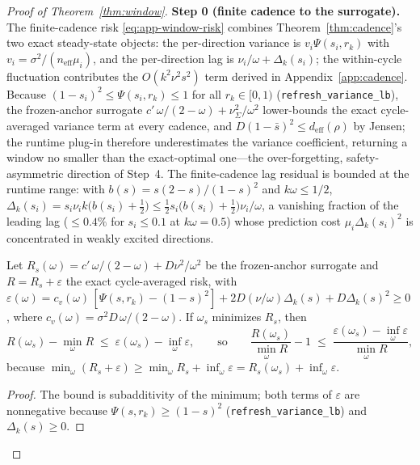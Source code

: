 \begin{proof}[Proof of Theorem~\ref{thm:window}]
\textbf{Step 0 (finite cadence to the surrogate).}
The finite-cadence risk \eqref{eq:app-window-risk} combines Theorem~\ref{thm:cadence}'s two exact steady-state objects: the per-direction variance is $v_i\Psi(s_i,r_k)$ with $v_i=\sigma^2/(n_{\mathrm{eff}}\mu_i)$, and the per-direction lag is $\nu_i/\omega+\Delta_k(s_i)$; the within-cycle fluctuation contributes the $O(k^2\nu^2s^2)$ term derived in Appendix~\ref{app:cadence}.
Because $(1-s_i)^2 \le \Psi(s_i,r_k) \le 1$ for all $r_k \in [0,1)$ (\texttt{refresh\_variance\_lb}), the frozen-anchor surrogate $c'\,\omega/(2-\omega)+\nu^2_\Sigma/\omega^2$ lower-bounds the exact cycle-averaged variance term at every cadence, and $D(1-\bar s)^2 \le d_{\mathrm{eff}}(\rho)$ by Jensen; the runtime plug-in therefore underestimates the variance coefficient, returning a window no smaller than the exact-optimal one---the over-forgetting, safety-asymmetric direction of Step~4.
The finite-cadence lag residual is bounded at the runtime range: with $b(s)=s(2-s)/(1-s)^2$ and $k\omega \le 1/2$, $\Delta_k(s_i)=s_i\nu_i k\bigl(b(s_i)+\tfrac12\bigr)\le \tfrac12 s_i\bigl(b(s_i)+\tfrac12\bigr)\nu_i/\omega$, a vanishing fraction of the leading lag ($\le 0.4\%$ for $s_i\le 0.1$ at $k\omega=0.5$) whose prediction cost $\mu_i\Delta_k(s_i)^2$ is concentrated in weakly excited directions.
\begin{proposition}
\label{prop:gap}
Let $R_s(\omega) = c'\,\omega/(2-\omega) + D\nu^2/\omega^2$ be the frozen-anchor surrogate and $R = R_s + \varepsilon$ the exact cycle-averaged risk, with
$\varepsilon(\omega) = c_v(\omega)\,[\Psi(s,r_k)-(1-s)^2] + 2D(\nu/\omega)\Delta_k(s) + D\Delta_k(s)^2 \ge 0$, where $c_v(\omega) = \sigma^2 D\,\omega/(2-\omega)$.
If $\omega_s$ minimizes $R_s$, then
\[
R(\omega_s) - \min_\omega R \;\le\; \varepsilon(\omega_s) - \inf_\omega \varepsilon,
\qquad\text{so}\qquad
\frac{R(\omega_s)}{\min_\omega R} - 1 \;\le\; \frac{\varepsilon(\omega_s) - \inf_\omega \varepsilon}{\min_\omega R},
\]
because $\min_\omega(R_s + \varepsilon) \ge \min_\omega R_s + \inf_\omega \varepsilon = R_s(\omega_s) + \inf_\omega\varepsilon$.
\end{proposition}
\begin{proof}
The bound is subadditivity of the minimum; both terms of $\varepsilon$ are nonnegative because $\Psi(s,r_k) \ge (1-s)^2$ (\texttt{refresh\_variance\_lb}) and $\Delta_k(s) \ge 0$.
\end{proof}


\end{proof}
